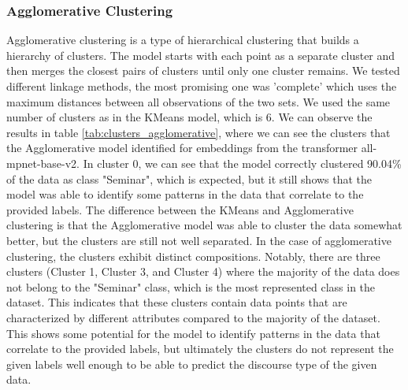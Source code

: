 \documentclass[fleqn,moreauthors,10pt]{ds_report}
\begin{document}
\subsubsection{Agglomerative Clustering}
Agglomerative clustering is a type of hierarchical clustering that builds a hierarchy of clusters. The model starts with each point as a separate cluster and then merges the closest pairs of clusters until only one cluster remains.
We tested different linkage methods, the most promising one was 'complete' which uses the maximum distances between all observations of the two sets.
We used the same number of clusters as in the KMeans model, which is 6. We can observe the results in table \ref{tab:clusters_agglomerative},
where we can see the clusters that the Agglomerative model identified for embeddings from the transformer all-mpnet-base-v2.
In cluster 0, we can see that the model correctly clustered 90.04\% of the data as class "Seminar", which is expected, but it still shows
that the model was able to identify some patterns in the data that correlate to the provided labels. 
The difference between the KMeans and Agglomerative clustering is that the Agglomerative model was able to cluster the data somewhat better, but the clusters are still not well separated.
In the case of agglomerative clustering, the clusters exhibit distinct compositions. Notably, there are three clusters (Cluster 1, Cluster 3, and Cluster 4) where the majority of the data does not belong to the "Seminar" class, which is the most represented class in the dataset. This indicates that these clusters contain data points that are characterized by different attributes compared to the majority of the dataset.
This shows some potential for the model to identify patterns in the data that correlate to the provided labels, but ultimately the clusters do not represent the given labels well enough
to be able to predict the discourse type of the given data.
\end{document}
